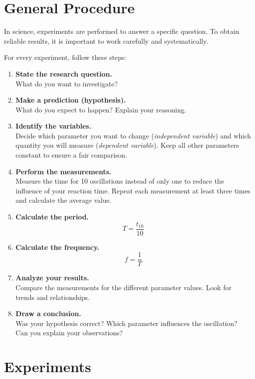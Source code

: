 \documentclass[a4paper,11pt]{article}
\begin{document}
\section{General Procedure}

In science, experiments are performed to answer a specific question. To obtain reliable results, it is important to work carefully and systematically.

For every experiment, follow these steps:

\begin{enumerate}
    \item \textbf{State the research question.}\\
    What do you want to investigate?

    \item \textbf{Make a prediction (hypothesis).}\\
    What do you expect to happen? Explain your reasoning.

    \item \textbf{Identify the variables.}\\
    Decide which parameter you want to change (\emph{independent variable}) and which quantity you will measure (\emph{dependent variable}). Keep all other parameters constant to ensure a fair comparison.

    \item \textbf{Perform the measurements.}\\
    Measure the time for 10 oscillations instead of only one to reduce the influence of your reaction time. Repeat each measurement at least three times and calculate the average value.

    \item \textbf{Calculate the period.}
    \[
    T=\frac{t_{10}}{10}
    \]

    \item \textbf{Calculate the frequency.}
    \[
    f=\frac{1}{T}
    \]

    \item \textbf{Analyze your results.}\\
    Compare the measurements for the different parameter values. Look for trends and relationships.

    \item \textbf{Draw a conclusion.}\\
    Was your hypothesis correct? Which parameter influences the oscillation? Can you explain your observations?
\end{enumerate}
\section{Experiments}
\end{document}
